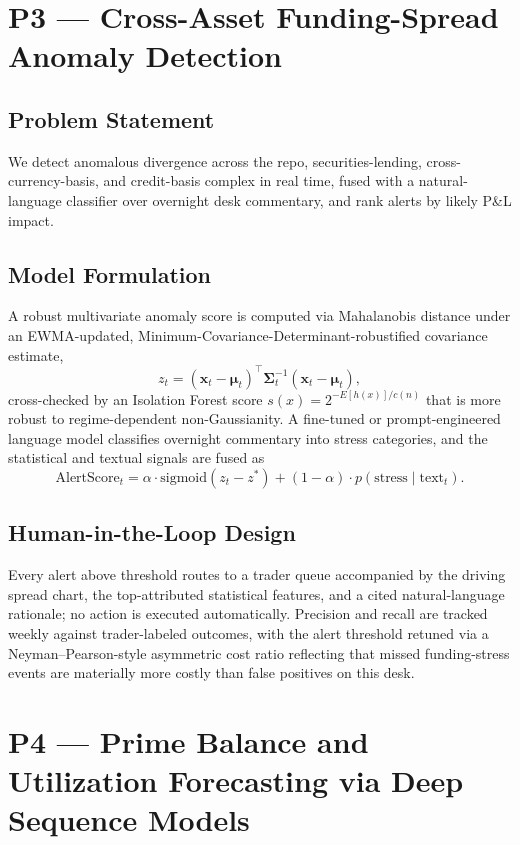 \documentclass[11pt]{report}
\begin{document}
\chapter{P3 --- Cross-Asset Funding-Spread Anomaly Detection}

\section{Problem Statement}
We detect anomalous divergence across the repo, securities-lending, cross-currency-basis, and
credit-basis complex in real time, fused with a natural-language classifier over overnight desk
commentary, and rank alerts by likely P\&L impact.

\section{Model Formulation}
A robust multivariate anomaly score is computed via Mahalanobis distance under an EWMA-updated,
Minimum-Covariance-Determinant-robustified covariance estimate,
\begin{equation}
z_t = (\mathbf{x}_t - \boldsymbol\mu_t)^\top \boldsymbol\Sigma_t^{-1} (\mathbf{x}_t - \boldsymbol\mu_t),
\end{equation}
cross-checked by an Isolation Forest score $s(x) = 2^{-E[h(x)]/c(n)}$ that is more robust to
regime-dependent non-Gaussianity. A fine-tuned or prompt-engineered language model classifies
overnight commentary into stress categories, and the statistical and textual signals are fused as
\begin{equation}
\text{AlertScore}_t = \alpha\cdot \text{sigmoid}(z_t - z^*) + (1-\alpha)\cdot p(\text{stress} \mid \text{text}_t).
\end{equation}

\section{Human-in-the-Loop Design}
Every alert above threshold routes to a trader queue accompanied by the driving spread chart, the
top-attributed statistical features, and a cited natural-language rationale; no action is executed
automatically. Precision and recall are tracked weekly against trader-labeled outcomes, with the
alert threshold retuned via a Neyman--Pearson-style asymmetric cost ratio reflecting that missed
funding-stress events are materially more costly than false positives on this desk.

\chapter{P4 --- Prime Balance and Utilization Forecasting via Deep Sequence Models}
\end{document}

